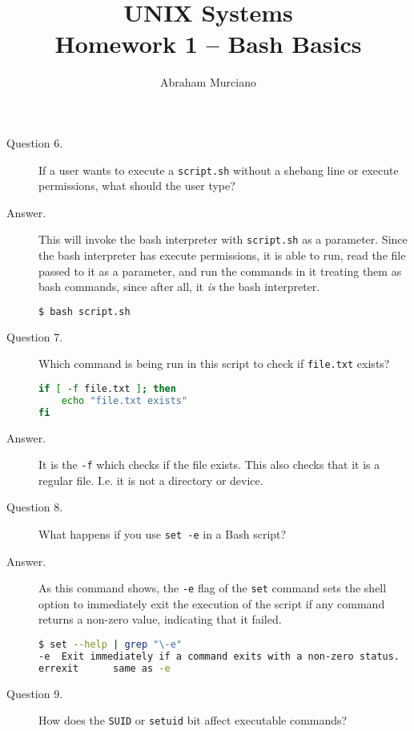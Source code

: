 \documentclass{article}
\title{UNIX Systems \\
\medskip
\large Homework 1 -- Bash Basics}
\author{Abraham Murciano}
\begin{document}
\maketitle

\begin{description}

	\item[Question 6.]
		If a user wants to execute a \verb`script.sh` without a shebang line or execute permissions, what should the user type?

	\item[Answer.]
		This will invoke the bash interpreter with \verb`script.sh` as a parameter. Since the bash interpreter has execute permissions, it is able to run, read the file passed to it as a parameter, and run the commands in it treating them as bash commands, since after all, it \emph{is} the bash interpreter.

		\begin{lstlisting}[language=bash]
$ bash script.sh
		\end{lstlisting}

	\item[Question 7.]
		Which command is being run in this script to check if \verb`file.txt` exists?

		\begin{lstlisting}[language=bash]
if [ -f file.txt ]; then
	echo "file.txt exists"
fi
		\end{lstlisting}

	\item[Answer.]
		It is the \verb`-f` which checks if the file exists. This also checks that it is a regular file. I.e. it is not a directory or device.

	\item[Question 8.]
		What happens if you use \verb`set -e` in a Bash script?

	\item[Answer.]
		As this command shows, the \verb`-e` flag of the \verb`set` command sets the shell option to immediately exit the execution of the script if any command returns a non-zero value, indicating that it failed.

		\begin{lstlisting}[language=bash]
$ set --help | grep "\-e"
-e  Exit immediately if a command exits with a non-zero status.
errexit      same as -e
		\end{lstlisting}

	\item[Question 9.]
		How does the \verb`SUID` or \verb`setuid` bit affect executable commands?


\end{description}
\end{document}
